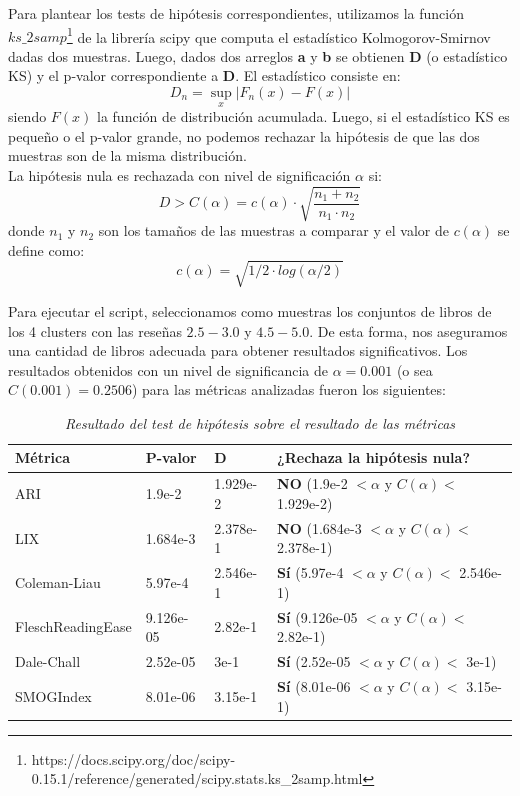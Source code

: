 \documentclass[12pt,journal,compsoc]{IEEEtran}
\begin{document}
Para plantear los tests de hipótesis correspondientes, utilizamos la función $ks\_2samp$\footnote{https://docs.scipy.org/doc/scipy-0.15.1/reference/generated/scipy.stats.ks\_2samp.html} de la librería scipy que computa el estadístico Kolmogorov-Smirnov dadas dos muestras. Luego, dados dos arreglos \textbf{a} y \textbf{b} se obtienen \textbf{D} (o estadístico KS) y el p-valor correspondiente a \textbf{D}. El estadístico consiste en:
$$D_{n}=\sup_{x}|F_{n}(x)-F(x)|$$
siendo $F(x)$ la función de distribución acumulada. Luego, si el estadístico KS es pequeño o el p-valor grande, no podemos rechazar la hipótesis de que las dos muestras son de la misma distribución\cite{degroot}.\\

La hipótesis nula es rechazada con nivel de significación $\alpha$ si:
\begin{equation} \label{eq:1}
D > C(\alpha) = c(\alpha) \cdot \sqrt{\frac{n_1+n_2}{n_1\cdot n_2}}
\end{equation}
donde $n_1$ y $n_2$ son los tamaños de las muestras a comparar y el valor de $c(\alpha)$ se define como:
$$c(\alpha) = \sqrt{1/2\cdot log(\alpha/2)}$$

Para ejecutar el script, seleccionamos como muestras los conjuntos de libros de los 4 clusters con las reseñas $2.5-3.0$ y $4.5-5.0$. De esta forma, nos aseguramos una cantidad de libros adecuada para obtener resultados significativos. Los resultados obtenidos con un nivel de significancia de $\alpha = 0.001$ (o sea $C(0.001) = 0.2506$) para las métricas analizadas fueron los siguientes:\\

\begin{table}[H]
\begin{center}
  \begin{tabular}{ | l | l | l | l | }
  \hline
  Métrica & P-valor & D & ¿Rechaza la hipótesis nula?\\
  \hline
  ARI & 1.9e-2 & 1.929e-2 & \textbf{NO} (1.9e-2 $< \alpha$ y $C(\alpha) <$ 1.929e-2)\\
  \hline
  LIX & 1.684e-3 & 2.378e-1 & \textbf{NO} (1.684e-3 $< \alpha$ y $C(\alpha) <$ 2.378e-1)\\
  \hline
  Coleman-Liau & 5.97e-4 & 2.546e-1 & \textbf{Sí} (5.97e-4 $< \alpha$ y $C(\alpha) <$ 2.546e-1)\\
  \hline
  FleschReadingEase & 9.126e-05 & 2.82e-1 & \textbf{Sí} (9.126e-05 $< \alpha$ y $C(\alpha) <$ 2.82e-1)\\
  \hline
  Dale-Chall & 2.52e-05 & 3e-1 & \textbf{Sí} (2.52e-05 $< \alpha$ y $C(\alpha) <$ 3e-1)\\
  \hline
  SMOGIndex & 8.01e-06 & 3.15e-1 & \textbf{Sí} (8.01e-06 $< \alpha$ y $C(\alpha) <$ 3.15e-1)\\
  \hline
  \end{tabular}
  \caption{\small \textit{Resultado del test de hipótesis sobre el resultado de las métricas}}
  \label{table:resultadoMetricas}
  \end{center}
  \end{table}
\end{document}
